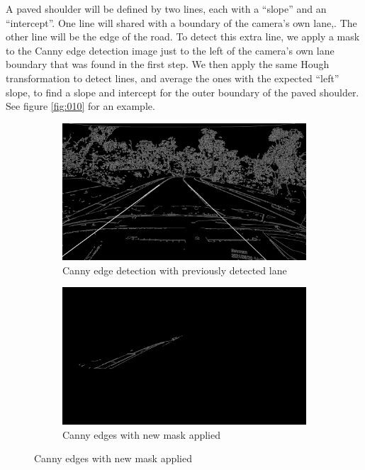 \documentclass[11pt,twoside]{report}
\begin{document}
A paved shoulder will be defined by two lines, each with a ``slope'' and an ``intercept''.  One line will shared with a boundary of the camera's own lane,.  The other line will be the edge of the road.  To detect this extra line, we apply a mask to the Canny edge detection image just to the left of the camera's own lane boundary that was found in the first step.  We then apply the same Hough transformation to detect lines, and average the ones with the expected ``left'' slope, to find a slope and intercept for the outer boundary of the paved shoulder.  See figure \ref{fig:010} for an example.

\begin{figure}[h]
\centering
\begin{subfigure}{0.3\textwidth}
	\includegraphics[width=\textwidth]{f010_canny_super.png}
	\caption{Canny edge detection with previously detected lane}
\end{subfigure}
\hfill
\begin{subfigure}{0.3\textwidth}
	\includegraphics[width=\textwidth]{f010_canny_mask.png}
	\caption{Canny edges with new mask applied}
\end{subfigure}

\end{figure}
\end{document}
